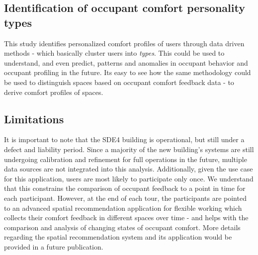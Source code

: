 \subsection{Identification of occupant comfort personality types}

This study identifies personalized comfort profiles of users through data driven methods - which basically cluster users into \emph{types}. This could be used to understand, and even predict, patterns and anomalies in occupant behavior and occupant profiling in the future. Its easy to see how the same methodology could be used to distinguish spaces based on occupant comfort feedback data - to derive comfort profiles of spaces.


\subsection{Limitations}
It is important to note that the SDE4 building is operational, but still under a defect and liability period. Since a majority of the new building's systems are still undergoing calibration and refinement for full operations in the future, multiple data sources are not integrated into this analysis. Additionally, given the use case for this application, users are most likely to participate only once. We understand that this constrains the comparison of occupant feedback to a point in time for each participant. However, at the end of each tour, the participants are pointed to an advanced spatial recommendation application for flexible working which collects their comfort feedback in different spaces over time - and helps with the comparison and analysis of changing states of occupant comfort. More details regarding the spatial recommendation system and its application would be provided in a future publication.










